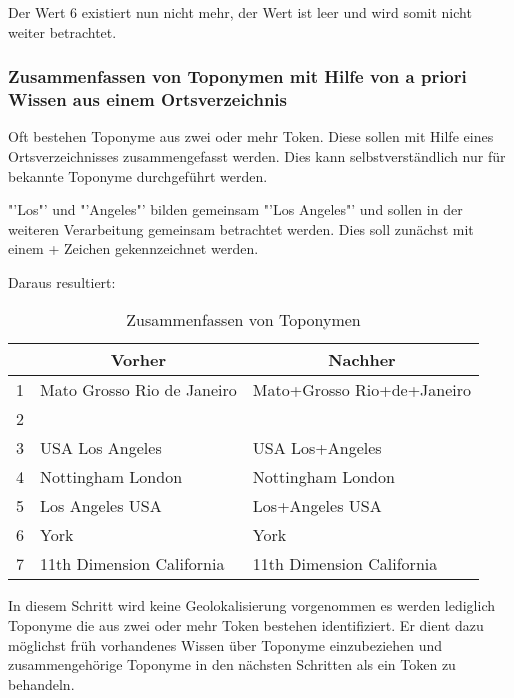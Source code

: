 				Der Wert 6 existiert nun nicht mehr, der Wert ist leer und wird somit nicht weiter betrachtet.

			\subsubsection{Zusammenfassen von Toponymen mit Hilfe von a priori Wissen aus einem Ortsverzeichnis}

				Oft bestehen Toponyme aus zwei oder mehr Token.
				Diese sollen mit Hilfe eines Ortsverzeichnisses zusammengefasst werden. 
				Dies kann selbstverständlich nur für bekannte Toponyme durchgeführt werden.
				
				"'Los"' und "'Angeles"' bilden gemeinsam "'Los Angeles"' und sollen in der weiteren Verarbeitung gemeinsam betrachtet werden. 
				Dies soll zunächst mit einem + Zeichen gekennzeichnet werden.

				Daraus resultiert:

				\begin{table}[h]
				\centering
				\caption{Zusammenfassen von Toponymen}
				\label{tab:VorverarbeitungZusammen}
				\begin{tabular}{|l|l|l|}
				\hline
				  & \multicolumn{1}{c|}{\textbf{Vorher}} & \multicolumn{1}{c|}{\textbf{Nachher}} \\ \hline \hline
				1 & Mato Grosso Rio de Janeiro           & Mato+Grosso Rio+de+Janeiro            \\ \hline
				2 &                                      &                                       \\ \hline
				3 & USA Los Angeles                      & USA Los+Angeles                       \\ \hline
				4 & Nottingham London                    & Nottingham London                     \\ \hline
				5 & Los Angeles USA                      & Los+Angeles USA                       \\ \hline
				6 & York                                 & York                                  \\ \hline
				7 & 11th Dimension California            & 11th Dimension California             \\ \hline
				\end{tabular}
				\end{table}

				In diesem Schritt wird keine Geolokalisierung vorgenommen es werden lediglich Toponyme die aus zwei oder mehr Token bestehen identifiziert.
				Er dient dazu möglichst früh vorhandenes Wissen über Toponyme einzubeziehen und zusammengehörige Toponyme in den nächsten Schritten als ein Token zu behandeln.


